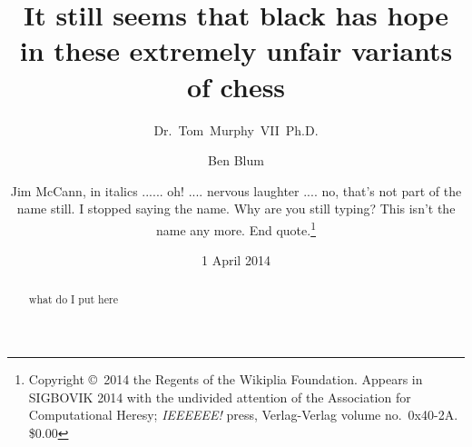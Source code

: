 \documentclass[twocolumn]{article}
\begin{document}
 

\title{It still seems that black has hope in these extremely unfair variants of chess}
\author{Dr.~Tom~Murphy~VII~Ph.D. \and Ben Blum \and
Jim McCann, in italics ...... oh! .... nervous laughter .... no, that's not part of the name still. I stopped saying the name. Why are you still typing? This isn't the name any more. End quote.\thanks{
Copyright \copyright\ 2014 the Regents of the Wikiplia
Foundation. Appears in SIGBOVIK 2014 with the undivided
attention of the Association for Computational Heresy; 
{\em IEEEEEE!} press, Verlag-Verlag volume no.~0x40-2A.
\$0.00}}

\renewcommand\th{\ensuremath{{}^{\textrm{th}}}}
\newcommand\st{\ensuremath{{}^{\textrm{st}}}}
\newcommand\rd{\ensuremath{{}^{\textrm{rd}}}}
\newcommand\nd{\ensuremath{{}^{\textrm{nd}}}}
\newcommand\at{\ensuremath{\scriptstyle @}}

\date{1 April 2014}

\maketitle \thispagestyle{empty}

\begin{abstract}
what do I put here
\end{abstract}












% 
\end{document}
